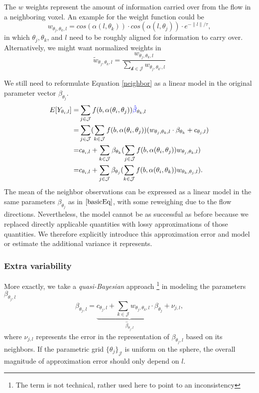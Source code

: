 \documentclass[11pt]{amsart}
\newcommand{\tj}{\theta_j}
\newcommand{\ti}{\theta_i}
\newcommand{\tk}{\theta_k}
\newcommand{\ytil}{Y_{\theta_i,l}}
\begin{document}
The $w$ weights represent the amount of information carried over from the flow in a neighboring voxel. 
An example for the weight function could be
\[ w_{\tj,\tk, l}  = cos(\alpha(l,\tk)) \cdot cos(\alpha(l, \tj)) \cdot e^{-\|l\|/\tau}, \]
in which $\tj, \tk$, and $l$ need to be roughly aligned for information to carry over. 
Alternatively, we might want normalized weights in 
\[\tilde{w}_{\tj,\tk, l}  = \frac{w_{\tj,\tk, l}}{\sum_\mathcal{k \in \mathcal{J}} w_{\tj,\theta_{k'}, l}} \]

We still need to reformulate Equation \eqref{neighbor} as a linear model in the original parameter vector $\beta_{\tj}$.
\begin{eqnarray*}
E[\ytil] = & \sum_{j \in \mathcal{J}}  f(b, \alpha(\ti, \tj)) \textcolor{blue}{\hat{\beta}}_{\tk,l} \\
 = & \sum_{j \in \mathcal{J}} ( \sum_{k\in\mathcal{J}} f(b, \alpha(\ti, \tj)) ( w_{\tj,\tk, l} \cdot \beta_{\tk} + c_{\tj,l})\\
 = & c_{\ti,l} +  \sum_{k\in\mathcal{J}}  \beta_{\tk}  (\sum_{j \in \mathcal{J}}  f(b, \alpha(\ti, \tj))  w_{\tj,\tk, l})\\
  = & c_{\ti,l} +  \sum_{j\in\mathcal{J}}  \beta_{\tj}  (\sum_{k\in \mathcal{J}}  f(b, \alpha(\ti, \tk))  w_{\tk,\tj, l}).
\end{eqnarray*}   
The mean of the neighbor observations can be expressed as a linear model in the same parameters $\beta_{\tj}$ as in $\eqref{basicEq}$,
with some reweighing due to the flow directions. Nevertheless, the model cannot be as successful as before because we replaced 
directly applicable quantities with lossy approximations of those quantities. We therefore explicitly introduce this approximation 
error and model or estimate the additional variance it represents. 

\subsubsection{Extra variability}
More exactly, we take a \emph{quasi-Bayesian} approach \footnote{The term is not technical, rather used here to point to an inconsistency}
in modeling the parameters $\beta_{\tj,l}$
\begin{equation}
\beta_{\tj,l} = \underbrace{c_{\tj,l} + \sum_{k\in\mathcal{J}} w_{\theta_j,\theta_k, l} \cdot \beta_{\tj}}_{\hat{\beta}_{\tj,l}} + \nu_{j,l}, 
\label{rexpress}
\end{equation}
where $\nu_{j,l}$ represents the error in the representation of $\beta_{\tj,l}$ based on its neighbors. 
If the parametric grid $\{\tj\}_\mathcal{J}$ is uniform on the sphere, the overall magnitude of approximation error 
should only depend on $l$. 
\end{document}
